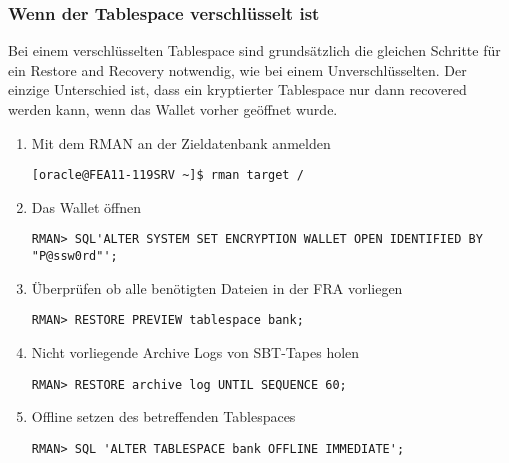         \subsubsection{Wenn der Tablespace verschlüsselt ist}
          \label{recoverencryptedts}
          Bei einem verschlüsselten Tablespace sind grundsätzlich die gleichen Schritte für ein Restore and Recovery notwendig, wie bei einem Unverschlüsselten. Der einzige Unterschied ist, dass ein kryptierter Tablespace nur dann recovered werden kann, wenn das Wallet vorher geöffnet wurde.
          \begin{enumerate}
            \item Mit dem RMAN an der Zieldatenbank anmelden
              \begin{lstlisting}[caption={An der Zieldatenbank anmelden},label=admin1461,language=terminal]
[oracle@FEA11-119SRV ~]$ rman target /
              \end{lstlisting}
            \item Das Wallet öffnen
              \begin{lstlisting}[caption={Öffnen des Wallets},label=admin1462,language=rman,emph={[9]ALTER,SYSTEM,SET,ENCRYPTION,WALLET,OPEN,IDENTIFIED,BY},emphstyle={[9]\color{magenta}\bfseries}]
RMAN> SQL'ALTER SYSTEM SET ENCRYPTION WALLET OPEN IDENTIFIED BY "P@ssw0rd"';
              \end{lstlisting}
            \item Überprüfen ob alle benötigten Dateien in der FRA vorliegen
              \begin{lstlisting}[caption={Voraussetzungen überprüfen},label=admin1463,language=rman]
RMAN> RESTORE PREVIEW tablespace bank;
              \end{lstlisting}
            \item Nicht vorliegende Archive Logs von SBT-Tapes holen
              \begin{lstlisting}[caption={Voraussetzungen überprüfen},label=admin1464,language=rman]
RMAN> RESTORE archive log UNTIL SEQUENCE 60;
              \end{lstlisting}
            \item Offline setzen des betreffenden Tablespaces
              \begin{lstlisting}[caption={Betreffenden Tablespace Offline setzen},label=admin1465,language=rman,emph={[9]ALTER,TABLESPACE,OFFLINE,IMMEDIATE},emphstyle={[9]\color{magenta}\bfseries}]
RMAN> SQL 'ALTER TABLESPACE bank OFFLINE IMMEDIATE';
              \end{lstlisting}

\end{enumerate}
